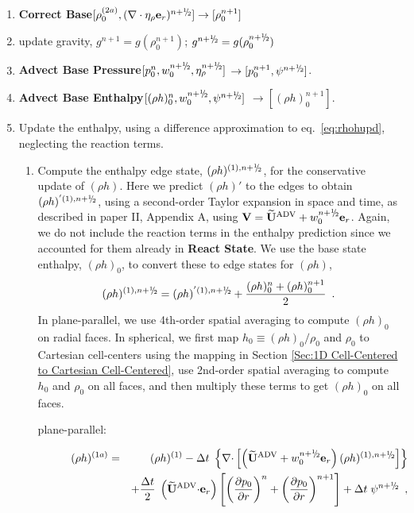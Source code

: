 \begin{description}
\begin{enumerate}
\item {\bf Correct Base}$[\rho_0^{(2a)}, (\nabla\cdot\etarho\er)^{\nph}] \rightarrow [\rho_0^{n+1}]$

\item update gravity, $g^{n+1} = g(\rho_0^{n+1})$; $g^{\nph} = g(\rho_0^\nph)$

\item {\bf Advect Base Pressure}$[p_0^{n}, w_0^{\nph}, \etarho^{n+\myhalf}]$ 
$\rightarrow [p_0^{n+1}, \psi^{n+\myhalf}]$.

\item {\bf Advect Base Enthalpy}$[(\rho h)_0^{n}, w_0^{\nph}, \psi^{\nph}]$ 
$\rightarrow [(\rho h)_0^{n+1}]$.

\item Update the enthalpy, using a difference approximation to
  eq.~\ref{eq:rhohupd}, neglecting the reaction terms.

  \begin{enumerate}
  \renewcommand{\labelenumii}{{\bf \roman{enumii}}.}

  \item Compute the enthalpy edge state, $(\rho h)^{(1),\nph}$, for
    the conservative update of $(\rho h)$. Here we predict $(\rho h)'$
    to the edges to obtain $(\rho h)^{'(1),\nph}$, 
    using a second-order Taylor expansion in space and
    time, as described in paper II, Appendix A, using $\Vb =
    \uadvtwo+w_0^{\nph} \er$.  Again, we do not include the reaction
    terms in the enthalpy prediction since we accounted for them
    already in {\bf React State}. We use the base state enthalpy,
    $(\rho h)_0$, to convert these to edge states for $(\rho h)$,
\begin{equation}
(\rho h)^{(1),\nph} = 
(\rho h)^{'(1),\nph} + \frac{(\rho h)_0^n + (\rho h)_0^{n+1}}{2} \enskip .
\end{equation}
  In plane-parallel, we use 4th-order spatial averaging to compute $(\rho h)_0$
  on radial faces.  In spherical, we first map $h_0 \equiv (\rho h)_0/\rho_0$ 
  and $\rho_0$ to Cartesian cell-centers using the mapping in Section 
  \ref{Sec:1D Cell-Centered to Cartesian Cell-Centered}, use 2nd-order spatial 
  averaging to compute $h_0$ and $\rho_0$ on all faces, and then multiply these 
  terms to get $(\rho h)_0$ on all faces.

\begin{description}
\item[plane-parallel:]

\begin{eqnarray}
(\rho h)^{(1a)} &=& (\rho h)^{(1)} - \dt \; \left\{ \nablab \cdotb \left[ \left(\uadvtwo+w_0^{\nph} \er\right)  
(\rho h)^{(1),\nph} \right] \right\} \nonumber \\
&& + \frac{\dt}{2} \; \left(\uadvtwo \cdotb \er\right)
\left [ \left(\frac{\partial p_0}{\partial r} \right)^{n}
      + \left(\frac{\partial p_0}{\partial r} \right)^{n+1}  \right ] 
+ \dt \; \psi^{\nph} \enskip ,
\end{eqnarray}


\end{description}
\end{enumerate}
\end{enumerate}
\end{description}
